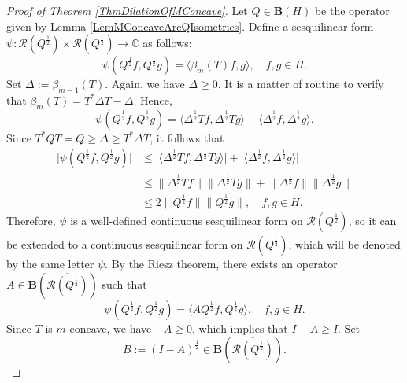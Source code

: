 \documentclass{amsart}
\renewcommand{\le}{\leqslant}
\renewcommand{\ge}{\geqslant}
\theoremstyle{definition}
\numberwithin{equation}{section}
\begin{document}
\begin{proof}[Proof of Theorem \ref{ThmDilationOfMConcave}]
    Let $ Q\in \mathbf{B}(H) $ be the operator given by Lemma \ref{LemMConcaveAreQIsometries}. Define a sesquilinear form $ \psi\colon \mathcal{R}(Q^{\frac{1}{2}})\times \mathcal{R}(Q^{\frac{1}{2}}) \to \mathbb{C} $ as follows:
    \begin{equation*}
        \psi(Q^{\frac{1}{2}}f,Q^{\frac{1}{2}}g) = \langle \beta_{m}(T)f,g\rangle, \quad f,g\in H.
    \end{equation*}
    Set $ \Delta := \beta_{m-1}(T) $. Again, we have $ \Delta \ge 0 $. It is a matter of routine to verify that $ \beta_{m}(T) = T^{\ast} \Delta T - \Delta $. Hence,
    \begin{equation*}
        \psi(Q^{\frac{1}{2}}f,Q^{\frac{1}{2}}g) = \langle \Delta^{\frac{1}{2}}Tf,\Delta^{\frac{1}{2}}Tg\rangle - \langle \Delta^{\frac{1}{2}}f,\Delta^{\frac{1}{2}}g\rangle.
    \end{equation*}
    Since $ T^{\ast}QT = Q \ge \Delta \ge T^{\ast}\Delta T $, it follows that
    \begin{align*}
        \lvert \psi(Q^{\frac{1}{2}}f,Q^{\frac{1}{2}}g) \rvert &\le \lvert  \langle \Delta^{\frac{1}{2}}Tf,\Delta^{\frac{1}{2}}Tg\rangle\rvert + \lvert \langle \Delta^{\frac{1}{2}}f,\Delta^{\frac{1}{2}}g\rangle\rvert\\
        &\le \lVert \Delta^{\frac{1}{2}}Tf\rVert \lVert \Delta^{\frac{1}{2}}Tg\rVert + \lVert \Delta^{\frac{1}{2}}f\rVert \lVert \Delta^{\frac{1}{2}}g \rVert\\
        & \le 2\lVert Q^{\frac{1}{2}}f\rVert\lVert Q^{\frac{1}{2}}g\rVert, \quad f,g\in H.
    \end{align*}
    Therefore, $ \psi $ is a well-defined continuous sesquilinear form on $ \mathcal{R}(Q^{\frac{1}{2}}) $, so it can be extended to a continuous sesquilinear form on $ \overline{\mathcal{R}(Q^{\frac{1}{2}})} $, which will be denoted by the same letter $ \psi $. By the Riesz theorem, there exists an operator $ A\in \mathbf{B}(\overline{\mathcal{R}(Q^{\frac{1}{2}})}) $ such that 
    \begin{equation*}
        \psi(Q^{\frac{1}{2}}f,Q^{\frac{1}{2}}g) = \langle AQ^{\frac{1}{2}}f,Q^{\frac{1}{2}}g\rangle, \quad f,g\in H.
    \end{equation*}
    Since $ T $ is $ m $-concave, we have $ -A \ge 0 $, which implies that $ I-A\ge I $. Set
    \begin{equation*}
        B := (I-A)^{\frac{1}{2}}\in \mathbf{B}(\overline{\mathcal{R}(Q^{\frac{1}{2}})}).

\end{equation*}
\end{proof}
\end{document}

